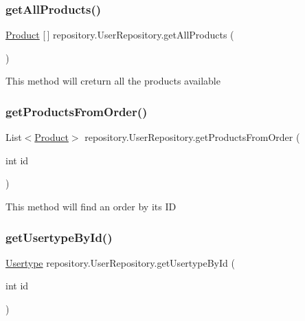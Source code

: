 \subsubsection{\texorpdfstring{get\+All\+Products()}{getAllProducts()}}
{\footnotesize\ttfamily \mbox{\hyperlink{classentity_1_1_product}{Product}} \mbox{[}$\,$\mbox{]} repository.\+User\+Repository.\+get\+All\+Products (\begin{DoxyParamCaption}{ }\end{DoxyParamCaption})\hspace{0.3cm}{\ttfamily [inline]}}

This method will creturn all the products available \mbox{\label{classrepository_1_1_user_repository_a413de9a5357ced95cfe6524c47b98bee}} 
\subsubsection{\texorpdfstring{get\+Products\+From\+Order()}{getProductsFromOrder()}}
{\footnotesize\ttfamily List$<$\mbox{\hyperlink{classentity_1_1_product}{Product}}$>$ repository.\+User\+Repository.\+get\+Products\+From\+Order (\begin{DoxyParamCaption}\item[{int}]{id }\end{DoxyParamCaption})\hspace{0.3cm}{\ttfamily [inline]}}

This method will find an order by its ID \mbox{\label{classrepository_1_1_user_repository_a7da3f6411186e8169f5730638e6a4032}} 
\subsubsection{\texorpdfstring{get\+Usertype\+By\+Id()}{getUsertypeById()}}
{\footnotesize\ttfamily \mbox{\hyperlink{classentity_1_1_usertype}{Usertype}} repository.\+User\+Repository.\+get\+Usertype\+By\+Id (\begin{DoxyParamCaption}\item[{int}]{id }\end{DoxyParamCaption})\hspace{0.3cm}{\ttfamily [inline]}}

